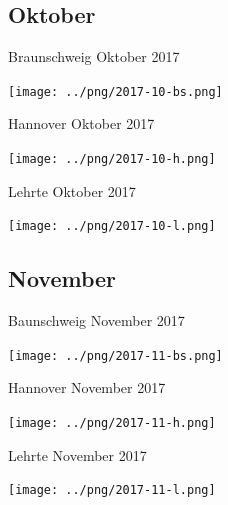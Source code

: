 \documentclass[aspectratio=169]{beamer} %
\begin{document}
\subsection{Oktober}
\begin{frame}{Braunschweig Oktober 2017}
  \begin{center}
    \texttt{[image: ../png/2017-10-bs.png]}
  \end{center}
\end{frame}
\begin{frame}{Hannover \hspace{4cm} Oktober 2017}
  \begin{center}
    \texttt{[image: ../png/2017-10-h.png]}
  \end{center}
\end{frame}
\begin{frame}{Lehrte \hspace{2cm} Oktober 2017}
  \begin{center}
    \texttt{[image: ../png/2017-10-l.png]}
  \end{center}
\end{frame}

\subsection{November}
\begin{frame}{Baunschweig November 2017}
  \begin{center}
    \texttt{[image: ../png/2017-11-bs.png]}
  \end{center}
\end{frame}
\begin{frame}{Hannover \hspace{4cm} November 2017}
  \begin{center}
    \texttt{[image: ../png/2017-11-h.png]}
  \end{center}
\end{frame}
\begin{frame}{Lehrte \hspace{2cm} November 2017}
  \begin{center}
    \texttt{[image: ../png/2017-11-l.png]}
  \end{center}
\end{frame}
\end{document}
